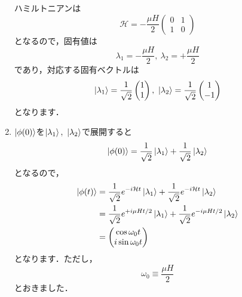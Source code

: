 \documentclass[a4paper,pdflatex,ja=standard]{bxjsarticle}
\begin{document}
\begin{enumerate}
  ハミルトニアンは
  \begin{equation}
    \mathcal{H}
    =
    -\frac{\mu H}{2}
    \begin{pmatrix}
      0 & 1 \\
      1 & 0
    \end{pmatrix}
  \end{equation}
  となるので，固有値は
  \begin{equation}
    \lambda_1
    =
    -\frac{\mu H}{2}
    ,\ 
    \lambda_2
    =
    +\frac{\mu H}{2}
  \end{equation}
  であり，対応する固有ベクトルは
  \begin{equation}
    \ket{\lambda_1}
    =
    \frac{1}{\sqrt{2}}
    \begin{pmatrix}
      1 \\
      1
    \end{pmatrix}
    ,\ 
    \ket{\lambda_2}
    =
    \frac{1}{\sqrt{2}}
    \begin{pmatrix}
      1 \\
      -1
    \end{pmatrix}
  \end{equation}
  となります．


  \item 

  $\ket{\phi(0)}$を$\ket{\lambda_1},\ \ket{\lambda_2}$で展開すると
  \begin{equation}
    \ket{\phi(0)}
    =
    \frac{1}{\sqrt{2}}
    \ket{\lambda_1}
    +
    \frac{1}{\sqrt{2}}
    \ket{\lambda_2}
  \end{equation}
  となるので，
  \begin{align}
    \ket{\phi(t)}
    &=
    \frac{1}{\sqrt{2}}
    e^{-i\mathcal{H}t}
    \ket{\lambda_1}
    +
    \frac{1}{\sqrt{2}}
    e^{-i\mathcal{H}t}
    \ket{\lambda_2}
    \nonumber
    \\
    &=
    \frac{1}{\sqrt{2}}
    e^{+i\mu Ht/2}
    \ket{\lambda_1}
    +
    \frac{1}{\sqrt{2}}
    e^{-i\mu Ht/2}
    \ket{\lambda_2}
    \nonumber
    \\
    &=
    \begin{pmatrix}
      \cos \omega_0 t \\
      i\sin \omega_0 t 
    \end{pmatrix}
  \end{align}
  となります．ただし，
  \begin{equation}
    \omega_0
    \equiv
    \frac{\mu H}{2}
  \end{equation}
  とおきました．



\end{enumerate}
\end{document}
